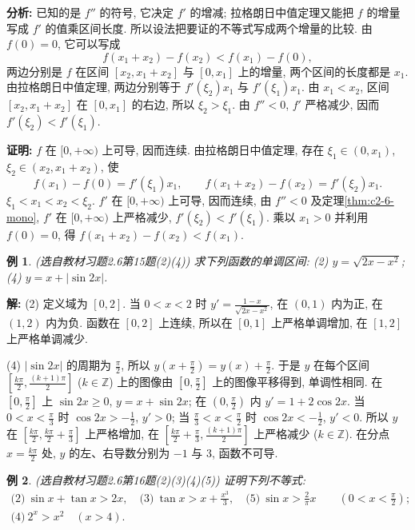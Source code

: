 \documentclass[UTF8,openany]{ctexbook}
\theoremstyle{chinesetextbook}
\newtheorem{example}{例}[section]
\newenvironment{cnproof}{\par\indent\textbf{证明:} \ignorespaces}{\par}
\newenvironment{cnsolution}{\par\indent\textbf{解:} \ignorespaces}{\par}
\begin{document}
\par\indent\textbf{分析:} 已知的是 $f''$ 的符号, 它决定 $f'$ 的增减; 拉格朗日中值定理又能把 $f$ 的增量写成 $f'$ 的值乘区间长度. 所以设法把要证的不等式写成两个增量的比较. 由 $f(0)=0$, 它可以写成
\[
f(x_1+x_2)-f(x_2)<f(x_1)-f(0),
\]
两边分别是 $f$ 在区间 $[x_2,x_1+x_2]$ 与 $[0,x_1]$ 上的增量, 两个区间的长度都是 $x_1$. 由拉格朗日中值定理, 两边分别等于 $f'(\xi_2)x_1$ 与 $f'(\xi_1)x_1$. 由 $x_1<x_2$, 区间 $[x_2,x_1+x_2]$ 在 $[0,x_1]$ 的右边, 所以 $\xi_2>\xi_1$. 由 $f''<0$, $f'$ 严格减少, 因而 $f'(\xi_2)<f'(\xi_1)$.
\begin{cnproof}
$f$ 在 $[0,+\infty)$ 上可导, 因而连续. 由拉格朗日中值定理, 存在 $\xi_1\in(0,x_1)$, $\xi_2\in(x_2,x_1+x_2)$, 使
\[
f(x_1)-f(0)=f'(\xi_1)x_1,\qquad f(x_1+x_2)-f(x_2)=f'(\xi_2)x_1.
\]
$\xi_1<x_1<x_2<\xi_2$. $f'$ 在 $[0,+\infty)$ 上可导, 因而连续, 由 $f''<0$ 及定理\ref{thm:c2-6-mono}, $f'$ 在 $[0,+\infty)$ 上严格减少, $f'(\xi_2)<f'(\xi_1)$. 乘以 $x_1>0$ 并利用 $f(0)=0$, 得 $f(x_1+x_2)-f(x_2)<f(x_1)$.
\end{cnproof}
\begin{example}\label{ex:c2-h6-15}
\textnormal{(选自教材习题2.6第15题(2)(4))} 求下列函数的单调区间: (2) $y=\sqrt{2x-x^2}$; (4) $y=x+\lvert\sin2x\rvert$.
\end{example}
\begin{cnsolution}
(2) 定义域为 $[0,2]$. 当 $0<x<2$ 时 $\displaystyle y'=\frac{1-x}{\sqrt{2x-x^2}}$, 在 $(0,1)$ 内为正, 在 $(1,2)$ 内为负. 函数在 $[0,2]$ 上连续, 所以在 $[0,1]$ 上严格单调增加, 在 $[1,2]$ 上严格单调减少.

(4) $\lvert\sin2x\rvert$ 的周期为 $\displaystyle\frac\pi2$, 所以 $\displaystyle y\left(x+\frac\pi2\right)=y(x)+\frac\pi2$. 于是 $y$ 在每个区间 $\displaystyle\left[\frac{k\pi}2,\frac{(k+1)\pi}2\right]$ ($k\in\mathbb Z$) 上的图像由 $\displaystyle\left[0,\frac\pi2\right]$ 上的图像平移得到, 单调性相同. 在 $\displaystyle\left[0,\frac\pi2\right]$ 上 $\sin2x\ge0$, $y=x+\sin2x$; 在 $\displaystyle\left(0,\frac\pi2\right)$ 内 $y'=1+2\cos2x$. 当 $\displaystyle0<x<\frac\pi3$ 时 $\displaystyle\cos2x>-\frac12$, $y'>0$; 当 $\displaystyle\frac\pi3<x<\frac\pi2$ 时 $\displaystyle\cos2x<-\frac12$, $y'<0$. 所以 $y$ 在 $\displaystyle\left[\frac{k\pi}2,\frac{k\pi}2+\frac\pi3\right]$ 上严格增加, 在 $\displaystyle\left[\frac{k\pi}2+\frac\pi3,\frac{(k+1)\pi}2\right]$ 上严格减少 ($k\in\mathbb Z$). 在分点 $\displaystyle x=\frac{k\pi}2$ 处, $y$ 的左、右导数分别为 $-1$ 与 $3$, 函数不可导.
\end{cnsolution}
\begin{example}\label{ex:c2-h6-16}
\textnormal{(选自教材习题2.6第16题(2)(3)(4)(5))} 证明下列不等式:
\[
\begin{gathered}
\text{(2)}\ \sin x+\tan x>2x,\quad\text{(3)}\ \tan x>x+\frac{x^3}3,\quad\text{(5)}\ \sin x>\frac2\pi x\qquad\left(0<x<\frac\pi2\right);\\
\text{(4)}\ 2^x>x^2\quad(x>4).
\end{gathered}
\]
\end{example}
\end{document}
